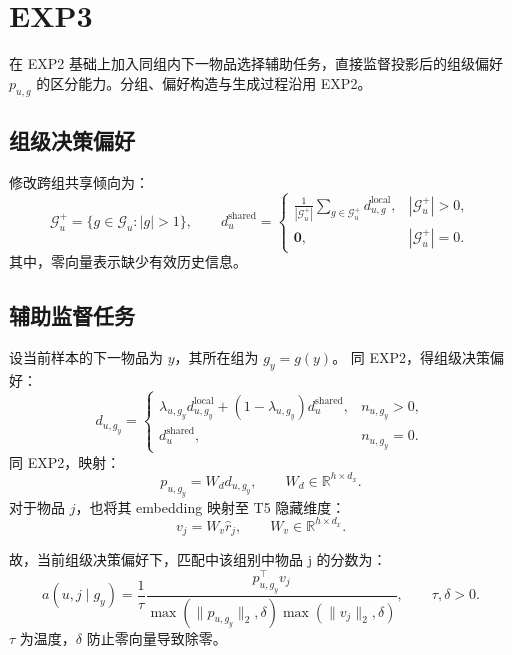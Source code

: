\documentclass[UTF8,11pt,a4paper]{ctexart}
\begin{document}
\section{EXP3}

在 EXP2 基础上加入同组内下一物品选择辅助任务，直接监督投影后的组级偏好 $p_{u,g}$ 的区分能力。分组、偏好构造与生成过程沿用 EXP2。

\subsection{组级决策偏好}

修改跨组共享倾向为：
\begin{equation}
 \mathcal G_u^{+}=\{g\in\mathcal G_u:|g|>1\},\qquad
 d_u^{\mathrm{shared}}=
 \begin{cases}
 \displaystyle\frac{1}{|\mathcal G_u^{+}|}
 \sum_{g\in\mathcal G_u^{+}}d_{u,g}^{\mathrm{local}},
 & |\mathcal G_u^{+}|>0,\\
 \mathbf 0, & |\mathcal G_u^{+}|=0.
 \end{cases}
\end{equation}
其中，零向量表示缺少有效历史信息。

\subsection{辅助监督任务}
设当前样本的下一物品为 $y$，其所在组为 $g_y=g(y)$。
同 EXP2，得组级决策偏好：
\begin{equation}
 d_{u,g_y}=
 \begin{cases}
 \lambda_{u,g_y}d_{u,g_y}^{\mathrm{local}}
 +(1-\lambda_{u,g_y})d_u^{\mathrm{shared}},
 & n_{u,g_y}>0,\\
 d_u^{\mathrm{shared}}, & n_{u,g_y}=0.
 \end{cases}
\end{equation}
同 EXP2，映射：
\begin{equation}
 p_{u,g_y}=W_d d_{u,g_y},\qquad
 W_d\in\mathbb R^{h\times d_x}.
\end{equation}
对于物品 $j$，也将其 embedding 映射至 T5 隐藏维度：
\begin{equation}
 v_j=W_v\hat r_j,\qquad
 W_v\in\mathbb R^{h\times d_x}.
\end{equation}

故，当前组级决策偏好下，匹配中该组别中物品 j 的分数为：
\begin{equation}
 a(u,j\mid g_y)
 =\frac{1}{\tau}
 \frac{p_{u,g_y}^{\top}v_j}
 {\max(\|p_{u,g_y}\|_2,\delta)\max(\|v_j\|_2,\delta)},
 \qquad \tau,\delta>0.
\end{equation}
$\tau$ 为温度，$\delta$ 防止零向量导致除零。
\end{document}

